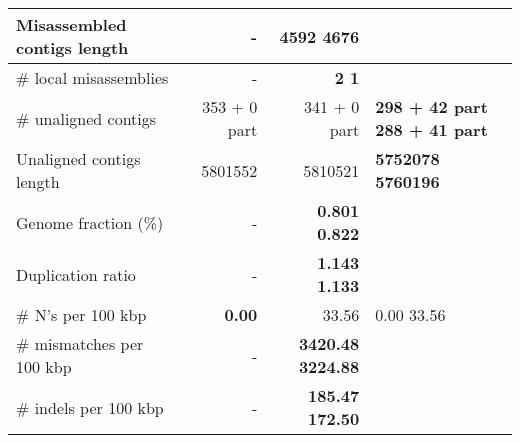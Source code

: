 \documentclass[12pt,a4paper]{article}
\begin{document}
\begin{table}[ht]
\begin{center}
\begin{tabular}{|l*{2}{|r}|}
Misassembled contigs length & - & {\bf 4592                    4676} \\ \hline
\# local misassemblies & - & {\bf 2                       1} \\ \hline
\# unaligned contigs & 353 + 0 part & 341 + 0 part & {\bf 298 + 42 part           288 + 41 part} \\ \hline
Unaligned contigs length & 5801552 & 5810521 & {\bf 5752078                 5760196} \\ \hline
Genome fraction (\%) & - & {\bf 0.801                   0.822} \\ \hline
Duplication ratio & - & {\bf 1.143                   1.133} \\ \hline
\# N's per 100 kbp & {\bf 0.00} & 33.56 & 0.00                    33.56 \\ \hline
\# mismatches per 100 kbp & - & {\bf 3420.48                 3224.88} \\ \hline
\# indels per 100 kbp & - & {\bf 185.47                  172.50} \\ \hline
\end{tabular}
\end{center}
\end{table}
\end{document}
